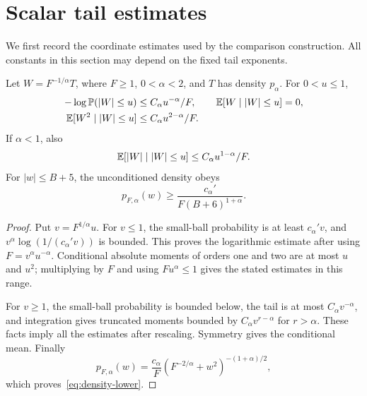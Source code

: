 \section{Scalar tail estimates}
\label{sec:scalar}
We first record the coordinate estimates used by the comparison construction. All constants in this section may depend on the fixed tail exponents.

\begin{lemma}\label{lem:small-coordinate}
Let $W=F^{-1/\alpha}T$, where $F\ge1$, $0<\alpha<2$, and $T$ has density $p_\alpha$. For $0<u\le1$,
\begin{align}
 -\log\mathbb P(|W|\le u)&\le C_\alpha u^{-\alpha}/F,\qquad
 \mathbb E[W\mid |W|\le u]=0,\\
 \mathbb E[W^2\mid |W|\le u]&\le C_\alpha u^{2-\alpha}/F.
 \label{eq:small-coordinate}
\end{align}
If $\alpha<1$, also
\begin{equation}
 \mathbb E[|W|\mid |W|\le u]\le C_\alpha u^{1-\alpha}/F.
 \label{eq:small-first-moment}
\end{equation}
For $|w|\le B+5$, the unconditioned density obeys
\begin{equation}
 p_{F,\alpha}(w)\ge\frac{c_\alpha'}{F(B+6)^{1+\alpha}}.
 \label{eq:density-lower}
\end{equation}
\end{lemma}
\begin{proof}
Put $v=F^{1/\alpha}u$. For $v\le1$, the small-ball probability is at least $c_\alpha'v$, and $v^\alpha\log(1/(c_\alpha'v))$ is bounded. This proves the logarithmic estimate after using $F=v^\alpha u^{-\alpha}$. Conditional absolute moments of orders one and two are at most $u$ and $u^2$; multiplying by $F$ and using $Fu^\alpha\le1$ gives the stated estimates in this range.

For $v\ge1$, the small-ball probability is bounded below, the tail is at most $C_\alpha v^{-\alpha}$, and integration gives truncated moments bounded by $C_\alpha v^{r-\alpha}$ for $r>\alpha$. These facts imply all the estimates after rescaling. Symmetry gives the conditional mean. Finally
\[
 p_{F,\alpha}(w)=\frac{c_\alpha}{F}
       (F^{-2/\alpha}+w^2)^{-(1+\alpha)/2},
\]
which proves~\eqref{eq:density-lower}.
\end{proof}

